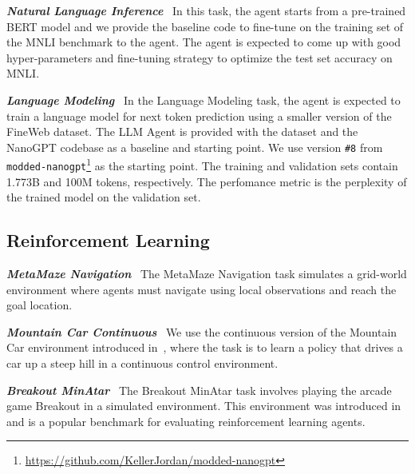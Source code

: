 \documentclass[]{fairmeta}
\newcommand{\ibold}[1]{\textbf{\textit{#1}}}
\newcommand{\dn}[1]{\colorbox{magenta}{\textcolor{white}{Deepak}}\textcolor{magenta}{\textbf{:#1}}}
\begin{document}
\ibold{Natural Language Inference}~\citep{williams2018multi} In this task, the agent starts from a pre-trained BERT model \citep{devlin2018bert} and we provide the baseline code to fine-tune on the training set of the MNLI benchmark to the agent. The agent is expected to come up with good hyper-parameters and fine-tuning strategy to optimize the test set accuracy on MNLI.

\ibold{Language Modeling}~\citep{modded_nanogpt_2024} In the Language Modeling task, the agent is expected to train a language model for next token prediction using a smaller version of the FineWeb \citep{penedo2024finewebdatasetsdecantingweb} dataset.
%
The LLM Agent is provided with the dataset and the NanoGPT \citep{modded_nanogpt_2024} codebase as a baseline and starting point. We use version \texttt{\#8} from \texttt{modded-nanogpt}\footnote{\url{https://github.com/KellerJordan/modded-nanogpt}} as the starting point. The training and validation sets contain 1.773B and 100M tokens, respectively.
%
The perfomance metric is the perplexity of the trained model on the validation set.


\subsection{Reinforcement Learning}


\ibold{MetaMaze Navigation}~\citep{miconi2020backpropaminetrainingselfmodifyingneural} The MetaMaze Navigation task simulates a grid-world environment where agents must navigate using local observations and reach the goal location.

\ibold{Mountain Car Continuous}~\citep{brockman2016openaigym} We use the continuous version of the Mountain Car environment introduced in~\citet{brockman2016openaigym}, where the task is to learn a policy that drives a car up a steep hill in a continuous control environment.

\ibold{Breakout MinAtar}~\citep{young2019minataratariinspiredtestbedthorough} The Breakout MinAtar task involves playing the arcade game Breakout in a simulated environment.
This environment was introduced in~\citet{young2019minataratariinspiredtestbedthorough} and is a popular benchmark for evaluating reinforcement learning agents.
\end{document}
